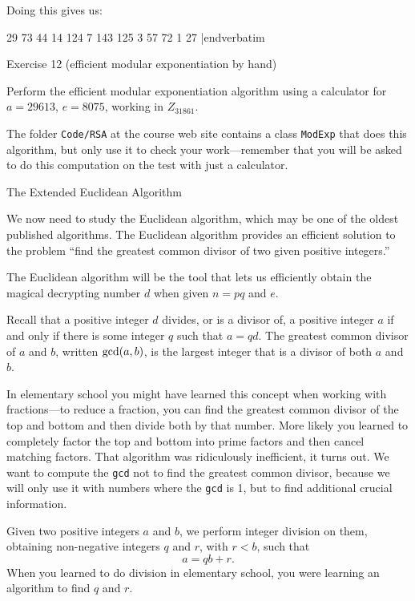 Doing this gives us:
\medskip

   29    73
 44   14
124    7   143
125    3    57
 72    1    27
|endverbatim
\border

{\bigboldfont Exercise 12} (efficient modular exponentiation by hand)
\medskip

Perform the efficient modular exponentiation algorithm using a calculator for
$a=29613$, $e=8075$, working in $Z_{31861}$.
\medskip

The folder {\tt Code/RSA} at the course web site contains a class {\tt ModExp} that
does this algorithm, but only use it to check your work---remember that
you will be asked to
do this computation on the test with just a calculator.
\border

\vfil\eject

{\bigboldfont The Extended Euclidean Algorithm}
\medskip

We now need to study the Euclidean algorithm, which may be one of the oldest published
algorithms.  The Euclidean algorithm provides an efficient solution to the problem ``find the
greatest common divisor of two given positive integers.''
\medskip

The Euclidean algorithm will be the tool that lets us efficiently obtain the magical
decrypting number $d$ when given $n=pq$ and $e$.
\medskip

Recall that a positive integer $d$ divides, or is a divisor of, a positive integer $a$ if and only if
there is some integer $q$ such that $a = q d$.  The greatest common divisor
of $a$ and $b$, written $\hbox{gcd}(a,b)$, is the largest integer that is a divisor of both $a$
and $b$.
\medskip

In elementary school you might have learned this concept when working with fractions---to
reduce a fraction, you can find the greatest common divisor of the top and bottom and then
divide both by that number.  More likely you learned to completely factor the top and bottom
into prime factors and then cancel matching factors.  That algorithm was ridiculously
inefficient, it turns out.  We want to compute the {\tt gcd} not to find the greatest common
divisor, because we will only
use it with numbers where the {\tt gcd} is 1, but to find additional crucial information.
\medskip

Given two positive integers $a$ and $b$, we perform integer division on them, obtaining
non-negative integers $q$ and $r$, with $r < b$, such that
$$
a = qb + r.
$$
When you learned to do division in elementary school, you were learning an algorithm to
find $q$ and $r$.
\medskip

